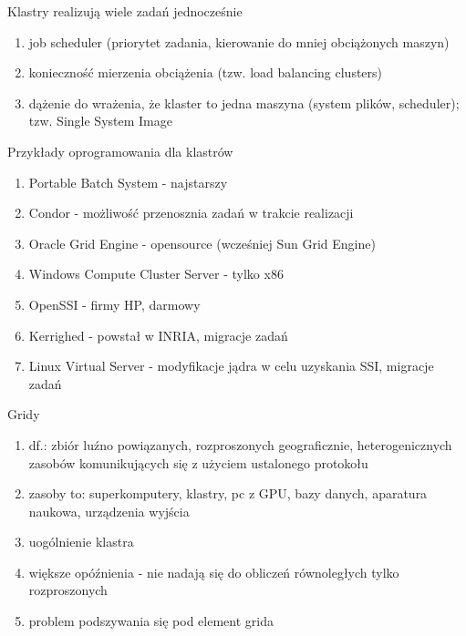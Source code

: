 \documentclass{beamer}
\begin{document}
\begin{frame}{Klastry realizują wiele zadań jednocześnie}
  \begin{enumerate}
  \item job scheduler (priorytet zadania, kierowanie do mniej obciążonych maszyn)
  \item konieczność mierzenia obciążenia (tzw. load balancing clusters)
  \item dążenie do wrażenia, że klaster to jedna maszyna (system plików, scheduler); tzw. Single System Image
  \end{enumerate}
\end{frame}

\begin{frame}{Przykłady oprogramowania dla klastrów}
  \begin{enumerate}
  \item Portable Batch System - najstarszy
  \item Condor - możliwość przenosznia zadań w trakcie realizacji
  \item Oracle Grid Engine - opensource (wcześniej Sun Grid Engine)
  \item Windows Compute Cluster Server - tylko x86
  \item OpenSSI - firmy HP, darmowy
  \item Kerrighed - powstał w INRIA, migracje zadań
  \item Linux Virtual Server - modyfikacje jądra w celu uzyskania SSI, migracje zadań
  \end{enumerate}
\end{frame}

\begin{frame}{Gridy}
  \begin{enumerate}
  \item df.: zbiór luźno powiązanych, rozproszonych geograficznie, heterogenicznych zasobów komunikujących się z użyciem ustalonego protokołu
  \item zasoby to: superkomputery, klastry, pc z GPU, bazy danych, aparatura naukowa, urządzenia wyjścia
  \item uogólnienie klastra
  \item większe opóźnienia - nie nadają się do obliczeń równoległych tylko rozproszonych
  \item problem podszywania się pod element grida
  \end{enumerate}
\end{frame}
\end{document}
